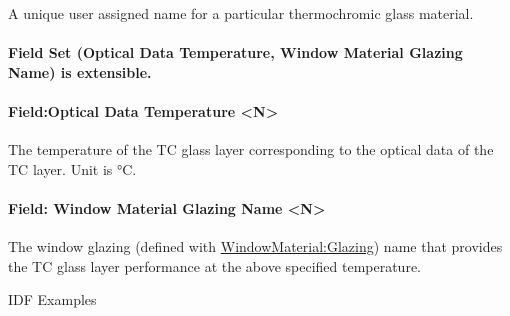 A unique user assigned name for a particular thermochromic glass material.

\paragraph{Field Set (Optical Data Temperature, Window Material Glazing Name) is extensible.}\label{field-set-optical-data-temperature-window-material-glazing-name-is-extensible.}

\paragraph{Field:Optical Data Temperature \textless{}N\textgreater{}}\label{fieldoptical-data-temperature-n}

The temperature of the TC glass layer corresponding to the optical data of the TC layer. Unit is °C.

\paragraph{Field: Window Material Glazing Name \textless{}N\textgreater{}}\label{field-window-material-glazing-name-n}

The window glazing (defined with \hyperref[windowmaterialglazing]{WindowMaterial:Glazing}) name that provides the TC glass layer performance at the above specified temperature.

IDF Examples


